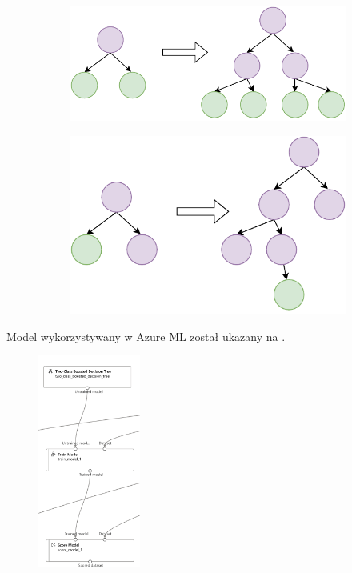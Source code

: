 \begin{figure}[H]
    \begin{subfigure}[m]{\textwidth}
        \includegraphics[width=\textwidth]{images/level-wise}
    \end{subfigure}
    \begin{subfigure}[m]{\textwidth}
        \includegraphics[width=\textwidth]{images/leaf-wise}
    \end{subfigure}
    \label{fig:leaf}
\end{figure}

Model wykorzystywany w Azure ML został ukazany na .

\begin{figure}[H]
    \centering
    \includegraphics[width=0.3\textwidth]{images/dt_pipe}
    \label{fig:dt-pipe}
\end{figure}

